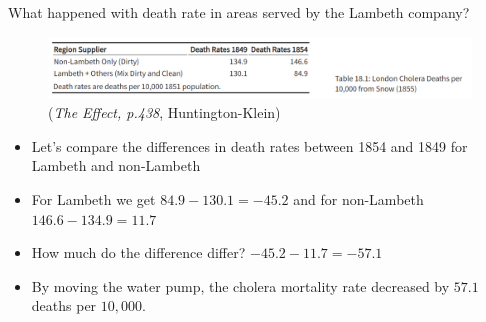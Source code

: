 \documentclass[notes,11pt, aspectratio=169]{beamer}
\begin{document}
\begin{frame}{What happened with death rate in areas served by the Lambeth company?}
\begin{figure}[H]
\centering
        \includegraphics[width=1\linewidth]{24_DiDLecture/24_DiDLecture_John Snow.png}
    \tiny (\emph{The Effect, p.438}, Huntington-Klein)
\end{figure}

\begin{itemize}
    \item Let's compare the differences in death rates between 1854 and 1849 for Lambeth and non-Lambeth
    \item For Lambeth we get $84.9 - 130.1 = -45.2$ and for non-Lambeth $146.6 - 134.9 = 11.7$ 
    \item How much do the difference differ?  $-45.2-11.7=-57.1$
    \item By moving the water pump, the cholera mortality rate decreased by $57.1$ deaths per $10,000$. 
\end{itemize}
\end{frame}
\end{document}
